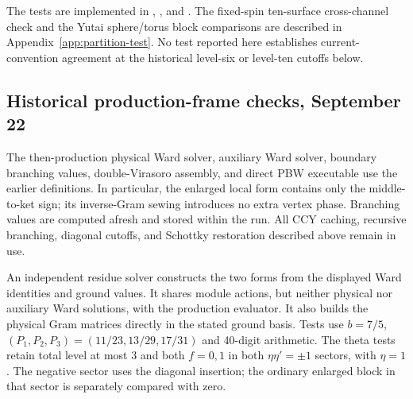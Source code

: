 \documentclass[11pt]{article}
\numberwithin{equation}{section}
\begin{document}
The tests are implemented in
,
, and
. The fixed-spin ten-surface
cross-channel check and the Yutai sphere/torus block comparisons
are described in Appendix~\ref{app:partition-test}. No test
reported here establishes current-convention agreement at the
historical level-six or level-ten cutoffs below.

\subsection{Historical production-frame checks, September 22}

The then-production physical Ward solver, auxiliary Ward solver, boundary
branching values, double-Virasoro assembly, and direct PBW executable use
the earlier definitions. In particular, the enlarged local form
contains only the middle-to-ket sign; its inverse-Gram sewing introduces
no extra vertex phase. Branching values are computed afresh and stored
within the run. All CCY caching, recursive branching, diagonal cutoffs,
and Schottky restoration described above remain in use.

An independent residue solver constructs the two forms from the displayed
Ward identities and ground values. It shares module actions, but neither
physical nor auxiliary Ward solutions, with the production evaluator.
It also builds the physical Gram matrices directly in the stated ground
basis. Tests use $b=7/5$, $(P_1,P_2,P_3)=(11/23,13/29,17/31)$ and
40-digit arithmetic. The theta tests retain total level at most 3 and
both $f=0,1$ in both $\eta\eta'=\pm1$ sectors, with $\eta=1$.
The negative sector uses the diagonal insertion; the ordinary enlarged
block in that sector is separately compared with zero.
\end{document}
